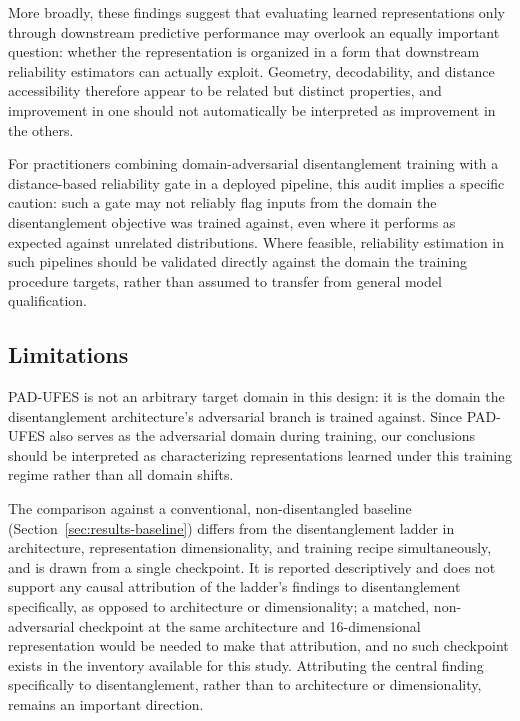 More broadly, these findings suggest that evaluating learned representations only through downstream predictive performance may overlook an equally important question: whether the representation is organized in a form that downstream reliability estimators can actually exploit. Geometry, decodability, and distance accessibility therefore appear to be related but distinct properties, and improvement in one should not automatically be interpreted as improvement in the others.

For practitioners combining domain-adversarial disentanglement training with a distance-based reliability gate in a deployed pipeline, this audit implies a specific caution: such a gate may not reliably flag inputs from the domain the disentanglement objective was trained against, even where it performs as expected against unrelated distributions. Where feasible, reliability estimation in such pipelines should be validated directly against the domain the training procedure targets, rather than assumed to transfer from general model qualification.

\subsection{Limitations}
\label{sec:discussion-limitations}

PAD-UFES is not an arbitrary target domain in this design: it is the domain the disentanglement architecture's adversarial branch is trained against. Since PAD-UFES also serves as the adversarial domain during training, our conclusions should be interpreted as characterizing representations learned under this training regime rather than all domain shifts.

The comparison against a conventional, non-disentangled baseline (Section~\ref{sec:results-baseline}) differs from the disentanglement ladder in architecture, representation dimensionality, and training recipe simultaneously, and is drawn from a single checkpoint. It is reported descriptively and does not support any causal attribution of the ladder's findings to disentanglement specifically, as opposed to architecture or dimensionality; a matched, non-adversarial checkpoint at the same architecture and 16-dimensional representation would be needed to make that attribution, and no such checkpoint exists in the inventory available for this study. Attributing the central finding specifically to disentanglement, rather than to architecture or dimensionality, remains an important direction.

